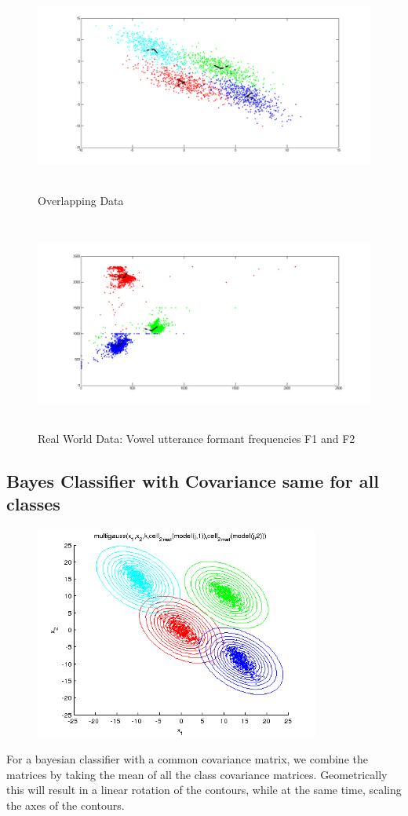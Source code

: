 \documentclass[11pt,a4paper]{article}
\begin{document}
\clearpage
\begin{figure}[H]
		\centering
\includegraphics[height=7cm]{Figures/OD_eig.png}
\caption{Overlapping Data}
\end{figure}

\begin{figure}[H]
	\centering
\includegraphics[height=7cm]{Figures/RWD_eig.png}
\caption{Real World Data: Vowel utterance formant frequencies F1 and F2}
\end{figure}

\clearpage
 \subsection{Bayes Classifier with Covariance same for all classes}
\begin{figure}[H]
		\centering
\includegraphics[height=7cm]{Figures/contour_1.png}
\end{figure}
For a bayesian classifier with a common covariance matrix, we combine the matrices by taking the mean of all the class covariance matrices. Geometrically this will result in a linear rotation of the contours, while at the same time, scaling the axes of the contours. 
\end{document}
